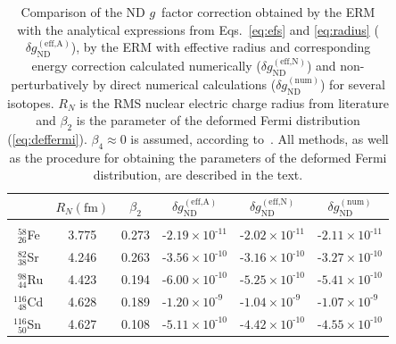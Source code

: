 \begin{table}[b]
\caption{\label{tab:spline}%
Comparison of the ND $g$~factor correction obtained by the ERM with the analytical expressions from Eqs.~\eqref{eq:efs} and \eqref{eq:radius} ($\delta g_{\text{ND}}^{(\text{eff,A})}$), by the ERM with effective radius and corresponding energy correction calculated numerically ($\delta g_{\text{ND}}^{(\text{eff,N})}$) and non-perturbatively by direct numerical calculations ($\delta g_{\text{ND}}^{(\text{num})}$) for several isotopes. $R_N$ is the RMS nuclear electric charge radius from literature \cite{Angeli2013} and $\beta_2$ is the parameter of the deformed Fermi distribution (\ref{eq:deffermi}). $\beta_4 \approx 0$ is assumed, according to~\cite{Moller1995}. All methods, as well as the procedure for obtaining the parameters of the deformed Fermi distribution, are described in the text.
}
\centering
\begin{tabular}{l|ccccc}
 &$R{\scriptstyle _N(\text{fm})}$& $\beta_2$ & $\delta g_{\text{ND}}^{(\text{eff,A})}$ & $\delta g_{\text{ND}}^{(\text{eff,N})}$ & $\delta g_{\text{ND}}^{(\text{num})}$\\
\hline\\[-5pt]
$^{\phantom{0}58}_{\phantom{0}26}$Fe & 3.775 & 0.273 & ${\text{-}}{2.19}{\scriptstyle\times}{10^{\text{-}11}}$ &${\text{-}}{2.02}{\scriptstyle\times}{10^{\text{-}11}}$&${\text{-}}{2.11}{\scriptstyle\times}{10^{\text{-}11}}$\\[4pt]
$^{\phantom{0}82}_{\phantom{0}38}$Sr & 4.246 & 0.263 & ${\text{-}}{3.56}{\scriptstyle\times}{10^{\text{-}10}}$ &${\text{-}}{3.16}{\scriptstyle\times}{10^{\text{-}10}}$&${\text{-}}{3.27}{\scriptstyle\times}{10^{\text{-}10}}$\\[4pt]
$^{\phantom{0}98}_{\phantom{0}44}$Ru & 4.423 & 0.194 & ${\text{-}}{6.00}{\scriptstyle\times}{10^{\text{-}10}}$ &${\text{-}}{5.25}{\scriptstyle\times}{10^{\text{-}10}}$&${\text{-}}{5.41}{\scriptstyle\times}{10^{\text{-}10}}$\\[4pt]
$^{116}_{\phantom{0}48}$Cd           & 4.628 & 0.189 & ${\text{-}}{1.20}{\scriptstyle\times}{10^{\text{-}9\phantom{0}}}$ &${\text{-}}{1.04}{\scriptstyle\times}{10^{\text{-}9\phantom{0}}}$&${\text{-}}{1.07}{\scriptstyle\times}{10^{\text{-}9\phantom{0}}}$\\[4pt]
$^{116}_{\phantom{0}50}$Sn           & 4.627 & 0.108 & ${\text{-}}{5.11}{\scriptstyle\times}{10^{\text{-}10}}$ &${\text{-}}{4.42}{\scriptstyle\times}{10^{\text{-}10}}$&${\text{-}}{4.55}{\scriptstyle\times}{10^{\text{-}10}}$\\[4pt]

\end{tabular}
\end{table}
